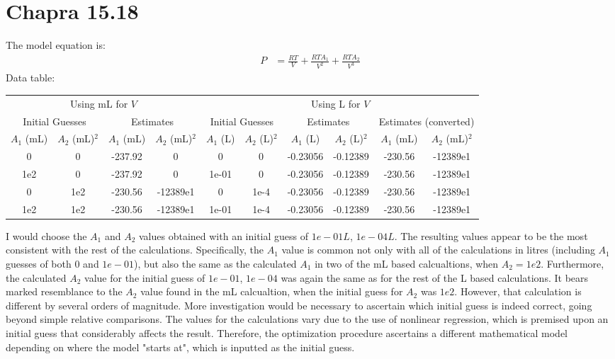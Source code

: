 \documentclass{article}
\begin{document}
\section{Chapra 15.18}
The model equation is:
\begin{align*}
P&=\frac{RT}{V} + \frac{RTA_1}{V^2} + \frac {RTA_2}{V^3}
\end{align*}
Data table:
\begin{center}
\begin{tabular}{|c|c|c|c|c|c|c|c|c|c|} \hline
\multicolumn{4}{|c|}{Using mL for $V$} & 
\multicolumn{6}{|c|}{Using L for $V$}\\
\multicolumn{2}{|c|}{Initial Guesses} & 
\multicolumn{2}{|c|}{Estimates} & 
\multicolumn{2}{|c|}{Initial Guesses} & 
\multicolumn{2}{|c|}{Estimates} & 
\multicolumn{2}{|c|}{Estimates (converted)} \\ 
$A_1$ (mL) & $A_2$ (mL)$^2$  & $A_1$ (mL)  & $A_2$ (mL)$^2$  & $A_1$ (L)  &
$A_2$ (L)$^2$ & $A_1$ (L) & $A_2$ (L)$^2$  & $A_1$ (mL) & $A_2$ (mL)$^2$  \\ \hline
0   & 0   & -237.92 & 0 & 0   & 0  & -0.23056 & -0.12389 & -230.56 & -12389e1\\
1e2 & 0   & -237.92 & 0 & 1e-01 & 0  & -0.23056 & -0.12389 & -230.56 & -12389e1 \\
0   & 1e2 & -230.56 & -12389e1 & 0   & 1e-4 & -0.23056 & -0.12389 & -230.56 & -12389e1 \\
1e2 & 1e2 & -230.56 & -12389e1 & 1e-01 & 1e-4 & -0.23056 & -0.12389 & -230.56 & -12389e1 \\ \hline
\end{tabular}
\end{center}
I would choose the $A_1$ and $A_2$ values obtained with an initial guess of $1e-01 L$, $1e-04 L$. The resulting values appear to be the most consistent with the rest of the calculations. Specifically, the $A_1$ value is common not only with all of the calculations in litres (including $A_1$ guesses of both $0$ and $1e-01$), but also the same as the calculated $A_1$ in two of the mL based calcualtions, when $A_2 = 1e2$. Furthermore, the calculated $A_2$ value for the initial guess of $1e-01$, $1e-04$ was again the same as for the rest of the L based calculations. It bears marked resemblance to the $A_2$ value found in the mL calcualtion, when the initial guess for $A_2$ was $1e2$. However, that calculation is different by several orders of magnitude. More investigation would be necessary to ascertain which initial guess is indeed correct, going beyond simple relative comparisons. The values for the calculations vary due to the use of nonlinear regression, which is premised upon an initial guess that considerably affects the result. Therefore, the optimization procedure ascertains a different mathematical model depending on where the model "starts at", which is inputted as the initial guess.
\end{document}
